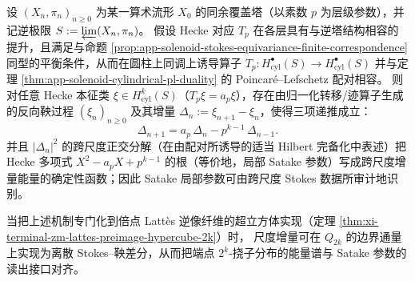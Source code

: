 \begin{conjecture}\label{conj:app-hecke-stokes-reverse-martingale-satake}
设 \((X_n,\pi_n)_{n\ge 0}\) 为某一算术流形 \(X_0\) 的同余覆盖塔（以素数 \(p\) 为层级参数），并记逆极限 \(S:=\varprojlim(X_n,\pi_n)\)。
假设 Hecke 对应 \(T_p\) 在各层具有与逆塔结构相容的提升，且满足与命题 \ref{prop:app-solenoid-stokes-equivariance-finite-correspondence} 同型的平衡条件，从而在圆柱上同调上诱导算子
\(
T_p:H^\bullet_{\mathrm{cyl}}(S)\to H^\bullet_{\mathrm{cyl}}(S)
\)
并与定理 \ref{thm:app-solenoid-cylindrical-pl-duality} 的 Poincar\'e--Lefschetz 配对相容。
则对任意 Hecke 本征类 \(\xi\in H^k_{\mathrm{cyl}}(S)\)（\(T_p\xi=a_p\xi\)），存在由归一化转移/迹算子生成的反向鞅过程 \((\xi_n)_{n\ge 0}\) 及其增量 \(\Delta_n:=\xi_{n+1}-\xi_n\)，使得三项递推成立：
\[
\Delta_{n+1}=a_p\,\Delta_n-p^{k-1}\,\Delta_{n-1}.
\]
并且 \(|\Delta_n|^2\) 的跨尺度正交分解（在由配对所诱导的适当 Hilbert 完备化中表述）把 Hecke 多项式
\(
X^2-a_p X+p^{k-1}
\)
的根（等价地，局部 Satake 参数）写成跨尺度增量能量的确定性函数；因此 Satake 局部参数可由跨尺度 Stokes 数据所审计地识别。
\par
当把上述机制专门化到倍点 Latt\`es 逆像纤维的超立方体实现（定理 \ref{thm:xi-terminal-zm-lattes-preimage-hypercube-2k}）时，
尺度增量可在 \(Q_{2k}\) 的边界通量上实现为离散 Stokes--鞅差分，从而把端点 \(2^k\)-挠子分布的能量谱与 Satake 参数的读出接口对齐。
\end{conjecture}

\endinput

